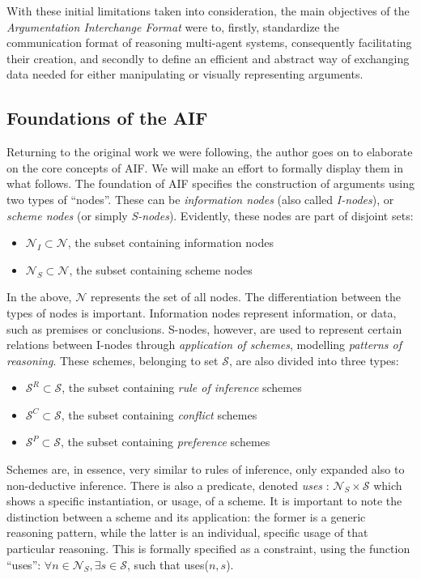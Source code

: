 \documentclass[12pt, a4paper]{article}
\begin{document}
With these initial limitations taken into consideration, the main objectives of the \emph{Argumentation Interchange Format} were to, firstly, standardize the communication format of reasoning multi-agent systems, consequently facilitating their creation, and secondly to define an efficient and abstract way of exchanging data needed for either manipulating or visually representing arguments.

\subsection{Foundations of the AIF}
Returning to the original work we were following, the author goes on to elaborate on the core concepts of AIF. We will make an effort to formally display them in what follows. The foundation of AIF specifies the construction of arguments using two types of ``nodes''. These can be \emph{information nodes} (also called \emph{I-nodes}), or \emph{scheme nodes} (or simply \emph{S-nodes}). Evidently, these nodes are part of disjoint sets:
\begin{itemize}
    \item $\mathcal{N}_I \subset \mathcal{N}$, the subset containing information nodes
    \item $\mathcal{N}_S \subset \mathcal{N}$, the subset containing scheme nodes
\end{itemize}
In the above, $\mathcal{N}$ represents the set of all nodes. The differentiation between the types of nodes is important. Information nodes represent information, or data, such as premises or conclusions. S-nodes, however, are used to represent certain relations between I-nodes through \emph{application of schemes}, modelling \emph{patterns of reasoning}. These schemes, belonging to set $\mathcal{S}$, are also divided into three types:
\begin{itemize}
    \item $\mathcal{S}^R \subset \mathcal{S}$, the subset containing \emph{rule of inference} schemes
    \item $\mathcal{S}^C \subset \mathcal{S}$, the subset containing \emph{conflict} schemes
    \item $\mathcal{S}^P \subset \mathcal{S}$, the subset containing \emph{preference} schemes
\end{itemize}
Schemes are, in essence, very similar to rules of inference, only expanded also to non-deductive inference. There is also a predicate, denoted \emph{uses} : $\mathcal{N}_S \times \mathcal{S}$ which shows a specific instantiation, or usage, of a scheme. It is important to note the distinction between a scheme and its application: the former is a generic reasoning pattern, while the latter is an individual, specific usage of that particular reasoning. This is formally specified as a constraint, using the function ``uses'': $\forall n \in \mathcal{N}_S, \exists s \in \mathcal{S}$, such that uses($n, s$).
\end{document}
